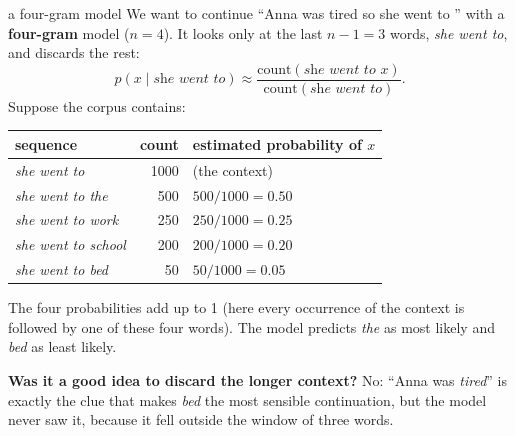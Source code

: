 \begin{nbexample}{a four-gram model}
We want to continue ``Anna was tired so she went to \underline{\quad}'' with a
\textbf{four-gram} model ($n = 4$). It looks only at the last $n - 1 = 3$ words,
\emph{she went to}, and discards the rest:
\[
  p(x \mid \textit{she went to}) \approx
  \frac{\text{count}(\textit{she went to } x)}{\text{count}(\textit{she went to})} .
\]
Suppose the corpus contains:
\begin{center}
\small
\begin{tabular}{@{}lrl@{}}
\toprule
sequence & count & estimated probability of $x$ \\
\midrule
\emph{she went to}        & 1000 & (the context) \\
\emph{she went to the}    & 500  & $500/1000 = 0.50$ \\
\emph{she went to work}   & 250  & $250/1000 = 0.25$ \\
\emph{she went to school} & 200  & $200/1000 = 0.20$ \\
\emph{she went to bed}    & 50   & $50/1000 = 0.05$ \\
\bottomrule
\end{tabular}
\end{center}
The four probabilities add up to 1 (here every occurrence of the context is followed by
one of these four words). The model predicts \emph{the} as most likely and \emph{bed} as
least likely.

\textbf{Was it a good idea to discard the longer context?} No: ``Anna was
\emph{tired}'' is exactly the clue that makes \emph{bed} the most sensible
continuation, but the model never saw it, because it fell outside the window of three
words.
\end{nbexample}

